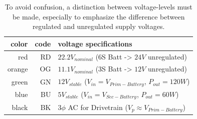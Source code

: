     \vspace{5mm} %
    
    \begin{table}[h]
        \centering
        \begin{tabular}{|r|r|l|} \hline 
             color&   code\footnotemark[1]&         voltage specifications\\ \hline 
             red&     RD&                           $22.2V_{nominal}$ (6S Batt -> $24V$ unregulated)\\ \hline 
             orange&  OG&                           $11.1V_{nominal}$ (3S Batt -> $12V$ unregulated)\\ \hline 
             green&   GN&                           $12V_{stable}$ ($V_{in}=V_{Prim-Battery}$, $P_{out}=120W$)\\ \hline 
             blue&    BU&                           $5V_{stable}$ ($V_{in}=V_{Sec-Battery}$, $P_{out}=60W$)\\ \hline 
             black&   BK&                           $3\phi$ AC for Drivetrain ($V_p \approx V_{Prim-Battery}$)
         \\ \hline\end{tabular}
        \caption{To avoid confusion, a distinction between voltage-levels must be made, especially to emphasize the difference between regulated and unregulated supply voltages. }
        \label{wiring_diagram_legend}
    \end{table}


    \vspace{5mm} %

    


